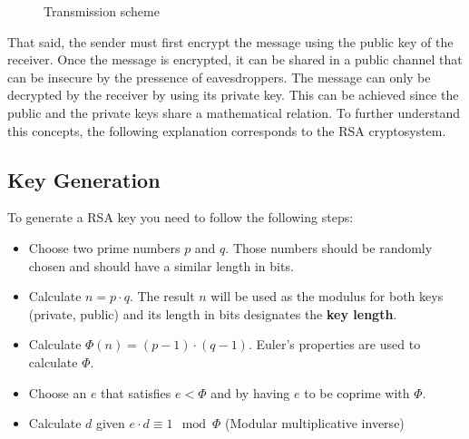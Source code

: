 \documentclass[usenames,dvipsnames,12pt]{report}
\begin{document}
\begin{figure}[H]
    \centering

    \caption{Transmission scheme}
    \label{fig:scheme}
\end{figure}

That said, the sender must first encrypt the message using the public key of the receiver.
Once the message is encrypted, it can be shared in a public channel that can be insecure by the pressence of
eavesdroppers. The message can only be decrypted by the receiver by using its private key. This can be achieved since
the public and the private keys share a mathematical relation. To further understand this concepts, the following explanation
corresponds to the RSA cryptosystem.

\subsection{Key Generation}

To generate a RSA key you need to follow the following steps:

\begin{itemize}
    \item Choose two prime numbers $p$ and $q$.
        Those numbers should be randomly chosen and should have a similar length in bits.
    \item Calculate $n = p \cdot q$. The result $n$ will be used as the modulus for both
        keys (private, public) and its length in bits designates the \textbf{key length}.
    \item Calculate $\Phi(n) = (p - 1) \cdot (q - 1)$. Euler's properties are used to calculate $\Phi$.
    \item Choose an $e$ that satisfies $e < \Phi$ and by having $e$ to be coprime with $\Phi$.
    \item Calculate $d$ given $e \cdot d \equiv 1 \mod \Phi$ (Modular multiplicative inverse)
\end{itemize}
\end{document}
